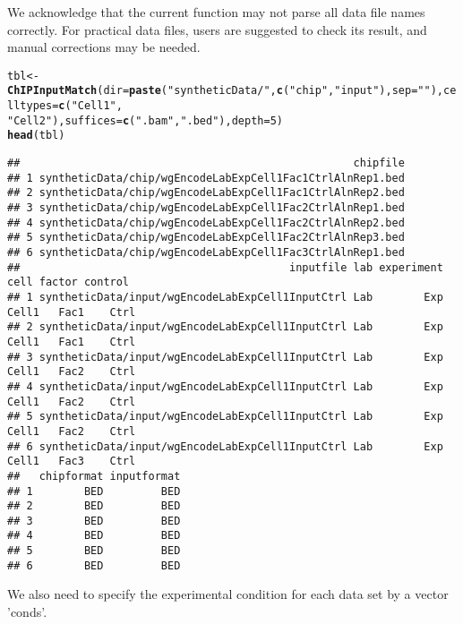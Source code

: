 \documentclass[a4paper,10pt]{article}\usepackage[]{graphicx}\usepackage[]{color}
\makeatletter
\newcommand{\hlnum}[1]{\textcolor[rgb]{0.686,0.059,0.569}{#1}}%
\newcommand{\hlstr}[1]{\textcolor[rgb]{0.192,0.494,0.8}{#1}}%
\newcommand{\hlstd}[1]{\textcolor[rgb]{0.345,0.345,0.345}{#1}}%
\newcommand{\hlkwb}[1]{\textcolor[rgb]{0.69,0.353,0.396}{#1}}%
\newcommand{\hlkwc}[1]{\textcolor[rgb]{0.333,0.667,0.333}{#1}}%
\newcommand{\hlkwd}[1]{\textcolor[rgb]{0.737,0.353,0.396}{\textbf{#1}}}%
\newenvironment{kframe}{%
 \def\at@end@of@kframe{}%
 \ifinner\ifhmode%
  \def\at@end@of@kframe{\end{minipage}}%
  \begin{minipage}{\columnwidth}%
 \fi\fi%
 \def\FrameCommand##1{\hskip\@totalleftmargin \hskip-\fboxsep
 \colorbox{shadecolor}{##1}\hskip-\fboxsep
     \hskip-\linewidth \hskip-\@totalleftmargin \hskip\columnwidth}%
 \MakeFramed {\advance\hsize-\width
   \@totalleftmargin\z@ \linewidth\hsize
   \@setminipage}}%
 {\par\unskip\endMakeFramed%
 \at@end@of@kframe}
\newenvironment{knitrout}{}{} %
\makeatother
\begin{document}
We acknowledge that the current function may not parse all data file names correctly. For practical data files, users are suggested to check its result, and manual corrections may be needed.

\begin{knitrout}
\color{fgcolor}\begin{kframe}
\begin{alltt}
\hlstd{tbl} \hlkwb{<-} \hlkwd{ChIPInputMatch}\hlstd{(}\hlkwc{dir} \hlstd{=} \hlkwd{paste}\hlstd{(}\hlstr{"syntheticData/"}\hlstd{,} \hlkwd{c}\hlstd{(}\hlstr{"chip"}\hlstd{,} \hlstr{"input"}\hlstd{),} \hlkwc{sep} \hlstd{=} \hlstr{""}\hlstd{),} \hlkwc{celltypes} \hlstd{=} \hlkwd{c}\hlstd{(}\hlstr{"Cell1"}\hlstd{,}
    \hlstr{"Cell2"}\hlstd{),} \hlkwc{suffices} \hlstd{=} \hlkwd{c}\hlstd{(}\hlstr{".bam"}\hlstd{,} \hlstr{".bed"}\hlstd{),} \hlkwc{depth} \hlstd{=} \hlnum{5}\hlstd{)}
\hlkwd{head}\hlstd{(tbl)}
\end{alltt}
\begin{verbatim}
##                                                    chipfile
## 1 syntheticData/chip/wgEncodeLabExpCell1Fac1CtrlAlnRep1.bed
## 2 syntheticData/chip/wgEncodeLabExpCell1Fac1CtrlAlnRep2.bed
## 3 syntheticData/chip/wgEncodeLabExpCell1Fac2CtrlAlnRep1.bed
## 4 syntheticData/chip/wgEncodeLabExpCell1Fac2CtrlAlnRep2.bed
## 5 syntheticData/chip/wgEncodeLabExpCell1Fac2CtrlAlnRep3.bed
## 6 syntheticData/chip/wgEncodeLabExpCell1Fac3CtrlAlnRep1.bed
##                                          inputfile lab experiment  cell factor control
## 1 syntheticData/input/wgEncodeLabExpCell1InputCtrl Lab        Exp Cell1   Fac1    Ctrl
## 2 syntheticData/input/wgEncodeLabExpCell1InputCtrl Lab        Exp Cell1   Fac1    Ctrl
## 3 syntheticData/input/wgEncodeLabExpCell1InputCtrl Lab        Exp Cell1   Fac2    Ctrl
## 4 syntheticData/input/wgEncodeLabExpCell1InputCtrl Lab        Exp Cell1   Fac2    Ctrl
## 5 syntheticData/input/wgEncodeLabExpCell1InputCtrl Lab        Exp Cell1   Fac2    Ctrl
## 6 syntheticData/input/wgEncodeLabExpCell1InputCtrl Lab        Exp Cell1   Fac3    Ctrl
##   chipformat inputformat
## 1        BED         BED
## 2        BED         BED
## 3        BED         BED
## 4        BED         BED
## 5        BED         BED
## 6        BED         BED
\end{verbatim}
\end{kframe}
\end{knitrout}

We also need to specify the experimental condition for each data set by a vector 'conds'.
\end{document}
